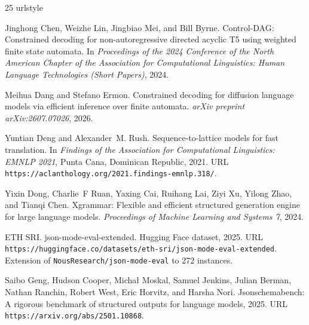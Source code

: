 \documentclass{article}
\begin{document}
\clearpage
\begin{thebibliography}{25}
\providecommand{\natexlab}[1]{#1}
\providecommand{\url}[1]{\texttt{#1}}
\expandafter\ifx\csname urlstyle\endcsname\relax
  \providecommand{\doi}[1]{doi: #1}\else
  \providecommand{\doi}{doi: \begingroup \urlstyle{rm}\Url}\fi

Jinghong Chen, Weizhe Lin, Jingbiao Mei, and Bill Byrne.
\newblock Control-{DAG}: Constrained decoding for non-autoregressive directed
  acyclic {T5} using weighted finite state automata.
\newblock In \emph{Proceedings of the 2024 Conference of the North American
  Chapter of the Association for Computational Linguistics: Human Language
  Technologies (Short Papers)}, 2024.

Meihua Dang and Stefano Ermon.
\newblock Constrained decoding for diffusion language models via efficient
  inference over finite automata.
\newblock \emph{arXiv preprint arXiv:2607.07026}, 2026.

Yuntian Deng and Alexander~M. Rush.
\newblock Sequence-to-lattice models for fast translation.
\newblock In \emph{Findings of the Association for Computational Linguistics:
  EMNLP 2021}, Punta Cana, Dominican Republic, 2021.
\newblock URL \url{https://aclanthology.org/2021.findings-emnlp.318/}.

Yixin Dong, Charlie~F Ruan, Yaxing Cai, Ruihang Lai, Ziyi Xu, Yilong Zhao, and
  Tianqi Chen.
\newblock Xgrammar: Flexible and efficient structured generation engine for
  large language models.
\newblock \emph{Proceedings of Machine Learning and Systems 7}, 2024.

{ETH SRI}.
\newblock json-mode-eval-extended.
\newblock Hugging Face dataset, 2025.
\newblock URL
  \url{https://huggingface.co/datasets/eth-sri/json-mode-eval-extended}.
\newblock Extension of \texttt{NousResearch/json-mode-eval} to 272 instances.

Saibo Geng, Hudson Cooper, Michał Moskal, Samuel Jenkins, Julian Berman,
  Nathan Ranchin, Robert West, Eric Horvitz, and Harsha Nori.
\newblock Jsonschemabench: A rigorous benchmark of structured outputs for
  language models, 2025.
\newblock URL \url{https://arxiv.org/abs/2501.10868}.


\end{thebibliography}
\end{document}
